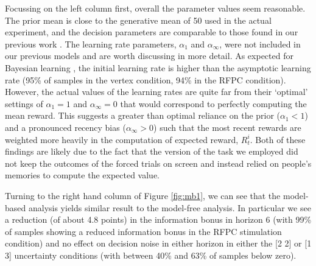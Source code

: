 \documentclass[12pt]{article}
\begin{document}
Focussing on the left column first, overall the parameter values seem reasonable.  The prior mean is close to the generative mean of 50 used in the actual experiment, and the decision parameters are comparable to those found in our previous work \cite{Wilson2014-ob}.  The learning rate parameters, $\alpha_1$ and $\alpha_{\infty}$, were not included in our previous models and are worth discussing in more detail.  As expected for Bayesian learning \cite{Kalman1960-uo,Nassar2010-fg}, the initial learning rate is higher than the asymptotic learning rate (95\% of samples in the vertex condition, 94\% in the RFPC condition).  However, the actual values of the learning rates are quite far from their `optimal' settings of $\alpha_1 = 1$ and $\alpha_{\infty} = 0$ that would correspond to perfectly computing the mean reward.  This suggests a greater than optimal reliance on the prior ($\alpha_1 < 1$) and a pronounced recency bias ($\alpha_{\infty} > 0$) such that the most recent rewards are weighted more heavily in the computation of expected reward, $R^i_{t}$.  Both of these findings are likely due to the fact that the version of the task we employed did not keep the outcomes of the forced trials on screen and instead relied on people's memories to compute the expected value. %





Turning to the right hand column of Figure \ref{fig:mb1}, we can see that the model-based analysis yields similar result to the model-free analysis.  In particular we see a reduction (of about 4.8 points) in the information bonus in horizon 6 (with 99\% of samples showing a reduced information bonus in the RFPC stimulation condition) and no effect on decision noise in either horizon in either the [2 2] or [1 3] uncertainty conditions (with between 40\% and 63\% of samples below zero). 
\end{document}
